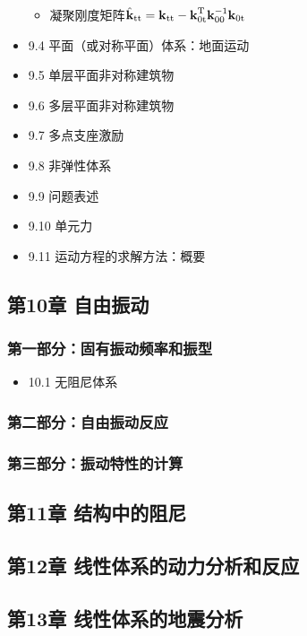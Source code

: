 \documentclass[11pt]{article}
\begin{document}
\begin{itemize}
\begin{itemize}
\item 凝聚刚度矩阵\(\hat{\bm{\mathrm{k}}}_{\mathrm{tt}} = \bm{\mathrm{k}}_{\mathrm{tt}} - \bm{\mathrm{k}}^{\mathrm{T}}_{\mathrm{0t}} \bm{\mathrm{k}}_{\mathrm{00}}^{-1} \bm{\mathrm{k}}_{\mathrm{0t}}\)
\end{itemize}
\item 9.4 平面（或对称平面）体系：地面运动
\label{sec:org8ede222}
\item 9.5 单层平面非对称建筑物
\label{sec:org0a3f413}
\item 9.6 多层平面非对称建筑物
\label{sec:org9da16b8}
\item 9.7 多点支座激励
\label{sec:orgc9bfbcd}
\item 9.8 非弹性体系
\label{sec:org3c4e8ee}
\item 9.9 问题表述
\label{sec:org4b3a36f}
\item 9.10 单元力
\label{sec:org0a2d77e}
\item 9.11 运动方程的求解方法：概要
\label{sec:orgb401d44}
\end{itemize}
\subsection*{第10章 自由振动}
\label{sec:orgf1b9476}
\subsubsection*{第一部分：固有振动频率和振型}
\label{sec:org55d7d98}
\begin{itemize}
\item 10.1 无阻尼体系
\label{sec:orgda0573f}
\end{itemize}
\subsubsection*{第二部分：自由振动反应}
\label{sec:org747e749}
\subsubsection*{第三部分：振动特性的计算}
\label{sec:orgc2516fd}
\subsection*{第11章 结构中的阻尼}
\label{sec:orgbd375b3}
\subsection*{第12章 线性体系的动力分析和反应}
\label{sec:org940bf02}
\subsection*{第13章 线性体系的地震分析}
\label{sec:orgbfb5659}
\end{document}
